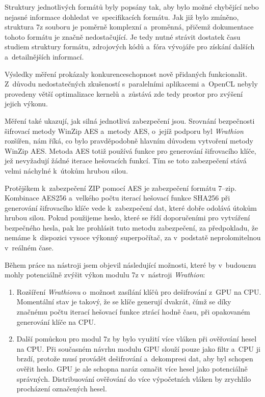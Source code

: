  Struktury jednotlivých formátů byly popsány tak, aby bylo možné chybějící nebo nejasné informace
dohledat ve~specifikacích formátu. Jak již bylo zmíněno, struktura 7z souboru je poměrně
komplexní a~proměnná, přičemž dokumentace tohoto formátu je značně nedostačující. Je tedy
nutné strávit dostatek času studiem struktury formátu, zdrojových kódů a~fóra vývojáře pro získání dalších a~detailnějších informací.

 Výsledky měření prokázaly konkurenceschopnost nově přidaných funkcionalit. Z~důvodu
nedostatečných zkušeností s~paralelními aplikacemi a~OpenCL nebyly provedeny větší
optimalizace kernelů a~zůstává zde tedy prostor pro zvýšení jejich výkonu. 

Měření také ukazují, jak silná jednotlivá zabezpečení jsou. Srovnání bezpečnosti šifrovací
metody WinZip AES a~metody AES, o~jejíž podporu byl {\it Wrathion} rozšířen, nám říká, co bylo
pravděpodobně hlavním důvodem vytvoření metody WinZip AES. Metoda AES totiž používá funkce pro
generování šifrovacího klíče, jež nevyžadují žádné iterace hešovacích funkcí. Tím se toto
zabezpečení stává velmi náchylné k~útokům hrubou silou.

Protějškem k~zabezpečení ZIP pomocí AES je zabezpečení formátu 7--zip. Kombinace AES256 a~velkého
počtu iterací hešovací funkce SHA256 při generování šifrovacího klíče vede k~zabezpečení dat,
které dobře odolává útokům hrubou silou. Pokud použijeme heslo, které se řídí doporučeními pro
vytváření bezpečného hesla, pak lze prohlásit tuto metodu zabezpečení, za předpokladu, že nemáme
k~dispozici vysoce výkonný superpočítač, za v~podstatě neprolomitelnou v~reálném čase.

Během práce na nástroji jsem objevil následující možnosti, které by v~budoucnu mohly potenciálně
zvýšit výkon modulu 7z v~nástroji {\it Wrathion}:
\begin{enumerate}
   \item Rozšíření {\it Wrathionu} o~možnost zasílání klíčů pro dešifrování z~GPU na CPU. Momentální
       stav je takový, že se klíče generují dvakrát, čímž se díky značnému počtu iterací hešovací
       funkce ztrácí hodně času, při opakovaném generování klíče na CPU.
    \item Další pomůckou pro modul 7z by bylo využití více vláken při ověřování hesel na
	CPU. Při současném návrhu modulu GPU slouží pouze jako filtr a~CPU ji brzdí, protože musí
	provádět dešifrování a~dekompresi dat, aby byl schopen ověřit heslo. GPU je ale schopna
	naráz označit více hesel jako potenciálně správných. Distribuování ověřování do
	více výpočetních vláken by zrychlilo procházení označených hesel.
\end{enumerate}

